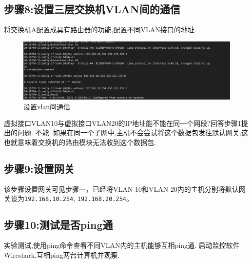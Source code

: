 \documentclass{myreport}
\begin{document}
\subsection{步骤8:设置三层交换机VLAN间的通信}

将交换机A配置成具有路由器的功能,配置不同VLAN接口的地址.

\begin{figure}[htp]
    \centering
    \includegraphics[width=13cm]{"./figure/2018-05-17-17-18-51.png"}
    \caption{设置vlan间通信}
    \label{fig:e2-s8-vlan}
\end{figure}



\begin{tcolorbox}[title = {讨论}]
虚拟接口VLAN10与虚拟接口VLAN20的IP地址能不能在同一个网段?回答步骤1提出的问题.
\tcblower
不能.
如果在同一个子网中,主机不会尝试将这个数据包发往默认网关,这也就意味着交换机的路由模块无法收到这个数据包.
\end{tcolorbox}


\subsection{步骤9:设置网关}

该步骤设置网关可见步骤一，已经将VLAN 10和VLAN 20内的主机分别将默认网关设为\texttt{192.168.10.254}, \texttt{192.168.20.254}。

\subsection{步骤10:测试是否ping通}

实验测试,使用ping命令查看不同VLAN内的主机能够互相ping通.
启动监控软件Wireshark,互相ping两台计算机并观察.
\end{document}
